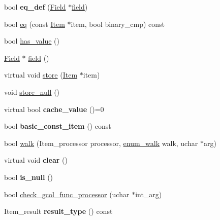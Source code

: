 \begin{DoxyCompactItemize}
\item 
\mbox{\label{classItem__cache_a257cd5873fafe24520e346310bd443a0}} 
bool {\bfseries eq\+\_\+def} (\mbox{\hyperlink{classField}{Field}} $\ast$\mbox{\hyperlink{classItem__cache_aec4011e0239387bff54d31814c1d4f43}{field}})
\item 
bool \mbox{\hyperlink{classItem__cache_a77bf4f66aca1a46aeca8ba732eed78ce}{eq}} (const \mbox{\hyperlink{classItem}{Item}} $\ast$item, bool binary\+\_\+cmp) const
\item 
bool \mbox{\hyperlink{classItem__cache_a3015799614afd6cd21ad99c539322923}{has\+\_\+value}} ()
\item 
\mbox{\hyperlink{classField}{Field}} $\ast$ \mbox{\hyperlink{classItem__cache_aec4011e0239387bff54d31814c1d4f43}{field}} ()
\item 
virtual void \mbox{\hyperlink{classItem__cache_a89d0134e0a71238cb6fa7a32a23f88e7}{store}} (\mbox{\hyperlink{classItem}{Item}} $\ast$item)
\item 
void \mbox{\hyperlink{classItem__cache_a49635825d6d757e8500936cb7d3665a5}{store\+\_\+null}} ()
\item 
\mbox{\label{classItem__cache_a4874a669b3e9b18582ded64750f2e8e4}} 
virtual bool {\bfseries cache\+\_\+value} ()=0
\item 
\mbox{\label{classItem__cache_a8bb25a519a22bd297822812817b382bb}} 
bool {\bfseries basic\+\_\+const\+\_\+item} () const
\item 
bool \mbox{\hyperlink{classItem__cache_a38750db48a153247ba0b65b6674f11b4}{walk}} (Item\+\_\+processor processor, \mbox{\hyperlink{classItem_a4e68f315ba2a26543339e9f0efed3695}{enum\+\_\+walk}} walk, uchar $\ast$arg)
\item 
\mbox{\label{classItem__cache_ac4f422dc232dedfe22045ba01bf1c252}} 
virtual void {\bfseries clear} ()
\item 
\mbox{\label{classItem__cache_a8dfb0a73097fc962e22998b998ff2d78}} 
bool {\bfseries is\+\_\+null} ()
\item 
bool \mbox{\hyperlink{classItem__cache_ae62bc37e1839d9749fdd70c485506c5f}{check\+\_\+gcol\+\_\+func\+\_\+processor}} (uchar $\ast$int\+\_\+arg)
\item 
\mbox{\label{classItem__cache_abc8fbed43ed06885fd79bcf767bad544}} 
Item\+\_\+result {\bfseries result\+\_\+type} () const
\end{DoxyCompactItemize}
